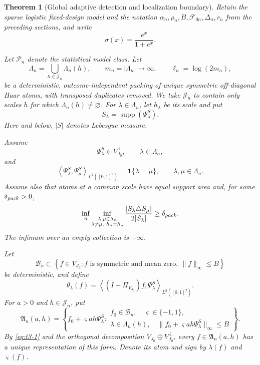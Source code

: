 \documentclass[10pt,a4paper]{amsart}
\newtheorem{theorem}{Theorem}
\begin{document}
\begin{theorem}[Global adaptive detection and localization boundary]
\label{thm:adaptive-detection-localization}
Retain the sparse logistic fixed-design model and the notation
\(\alpha_n,\rho_n,B,\mathcal F_{0n},\Delta_n,r_n\) from the preceding
sections, and write
\[
\sigma(x)=\frac{e^x}{1+e^x}.
\]

Let $\mathscr P_n$ denote the statistical model class. Let
\[
\Lambda_n
=
\bigcup_{h\in\mathcal J_n}\Lambda_n(h),
\qquad
m_n=|\Lambda_n|\longrightarrow\infty,
\qquad
\ell_n=\log(2m_n),
\]
be a deterministic, outcome-independent packing of unique symmetric
off-diagonal Haar atoms, with transposed duplicates removed.  We take
\(\mathcal J_n\) to contain only scales \(h\) for which
\(\Lambda_n(h)\ne\varnothing\).  For
\(\lambda\in\Lambda_n\), let \(h_\lambda\) be its scale and put
\[
S_\lambda=\operatorname{supp}(\Psi_\lambda^S).
\]
Here and below, \(|S|\) denotes Lebesgue measure.

Assume
\[
\Psi_\lambda^S\in V_{J_0}^{\perp},
\qquad
\lambda\in\Lambda_n,
\]
and
\begin{equation}
\left\langle
\Psi_\lambda^S,\Psi_\mu^S
\right\rangle_{L^2([0,1]^2)}
=
\mathbf 1\{\lambda=\mu\},
\qquad
\lambda,\mu\in\Lambda_n.
\label{eq:t3-1}
\end{equation}
Assume also that atoms at a common scale have equal support area and,
for some \(\delta_{\rm pack}>0\),
\begin{equation}
\inf_n
\inf_{\substack{\lambda,\mu\in\Lambda_n\\
                 \lambda\ne\mu,\ h_\lambda=h_\mu}}
\frac{|S_\lambda\triangle S_\mu|}{2|S_\lambda|}
\ge\delta_{\rm pack}.
\label{eq:t3-2}
\end{equation}
The infimum over an empty collection is \(+\infty\).

Let
\[
\mathcal B_n
\subset
\left\{
f\in V_{J_0}:
f\text{ is symmetric and mean zero},\
\|f\|_\infty\le B
\right\}
\]
be deterministic, and define
\begin{equation}
\theta_\lambda(f)
=
\left\langle
(I-\Pi_{V_{J_0}})f,\Psi_\lambda^S
\right\rangle_{L^2([0,1]^2)}.
\label{eq:t3-3}
\end{equation}
For \(a>0\) and \(h\in\mathcal J_n\), put
\[
\mathfrak A_n(a,h)
=
\left\{
f_0+\varsigma a h\Psi_\lambda^S:
\begin{array}{l}
f_0\in\mathcal B_n,\quad
\varsigma\in\{-1,1\},\\
\lambda\in\Lambda_n(h),\quad
\|f_0+\varsigma a h\Psi_\lambda^S\|_\infty\le B
\end{array}
\right\}.
\]
By \eqref{eq:t3-1} and the orthogonal decomposition
\(V_{J_0}\oplus V_{J_0}^{\perp}\), every
\(f\in\mathfrak A_n(a,h)\) has a unique representation of this form.
Denote its atom and sign by \(\lambda(f)\) and \(\varsigma(f)\).


\end{theorem}
\end{document}

